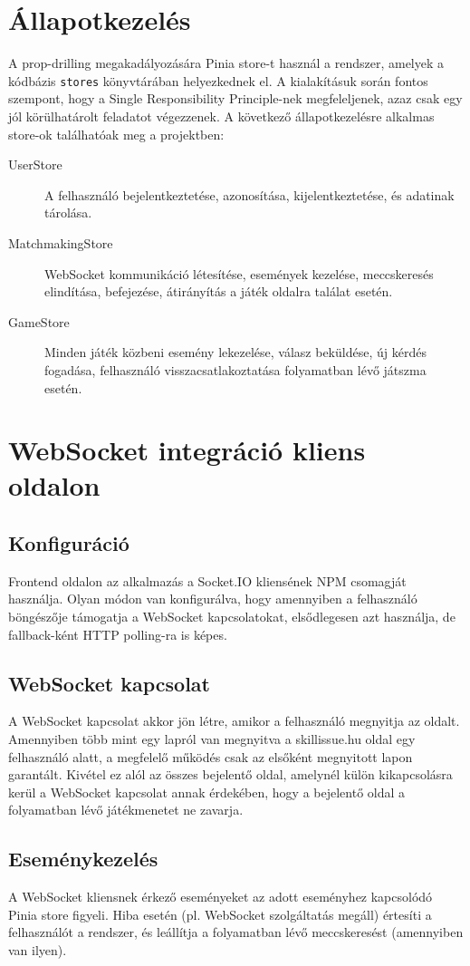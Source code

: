 \section{Állapotkezelés}
A prop-drilling megakadályozására Pinia store-t használ a rendszer, amelyek a kódbázis \texttt{stores} könyvtárában helyezkednek el. A kialakításuk során fontos szempont, hogy a Single Responsibility Principle-nek megfeleljenek, azaz csak egy jól körülhatárolt feladatot végezzenek. A következő állapotkezelésre alkalmas store-ok találhatóak meg a projektben:
\begin{description}
    \item[UserStore] A felhasználó bejelentkeztetése, azonosítása, kijelentkeztetése, és adatinak tárolása.
    \item[MatchmakingStore] WebSocket kommunikáció létesítése, események kezelése, meccskeresés elindítása, befejezése, átirányítás a játék oldalra találat esetén.
    \item[GameStore] Minden játék közbeni esemény lekezelése, válasz beküldése, új kérdés fogadása, felhasználó visszacsatlakoztatása folyamatban lévő játszma esetén.
\end{description}

\section{WebSocket integráció kliens oldalon}
\subsection{Konfiguráció}
Frontend oldalon az alkalmazás a Socket.IO kliensének NPM csomagját használja. Olyan módon van konfigurálva, hogy amennyiben a felhasználó böngészője támogatja a WebSocket kapcsolatokat, elsődlegesen azt használja, de fallback-ként HTTP polling-ra is képes.

\subsection{WebSocket kapcsolat}
A WebSocket kapcsolat akkor jön létre, amikor a felhasználó megnyitja az oldalt. Amennyiben több mint egy lapról van megnyitva a skillissue.hu oldal egy felhasználó alatt, a megfelelő működés csak az elsőként megnyitott lapon garantált. Kivétel ez alól az összes bejelentő oldal, amelynél külön kikapcsolásra kerül a WebSocket kapcsolat annak érdekében, hogy a bejelentő oldal a folyamatban lévő játékmenetet ne zavarja. 

\subsection{Eseménykezelés}
A WebSocket kliensnek érkező eseményeket az adott eseményhez kapcsolódó Pinia store figyeli. Hiba esetén (pl. WebSocket szolgáltatás megáll) értesíti a felhasználót a rendszer, és leállítja a folyamatban lévő meccskeresést (amennyiben van ilyen).